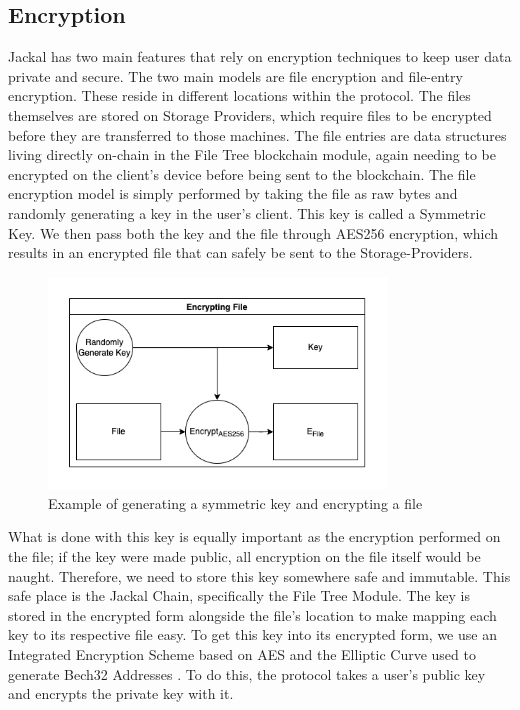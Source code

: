 \documentclass[a4paper]{article}
\begin{document}
\subsection{Encryption}
Jackal has two main features that rely on encryption techniques to keep user data private and secure. The two main models are file encryption and file-entry encryption. These reside in different locations within the protocol. The files themselves are stored on Storage Providers, which require files to be encrypted before they are transferred to those machines. The file entries are data structures living directly on-chain in the File Tree blockchain module, again needing to be encrypted on the client's device before being sent to the blockchain. The file encryption model is simply performed by taking the file as raw bytes and randomly generating a key in the user's client. This key is called a Symmetric Key. We then pass both the key and the file through AES256 encryption, which results in an encrypted file that can safely be sent to the Storage-Providers.
\begin{figure}[!htbp]
\centering
\includegraphics[width=0.8\textwidth]{assets/enc1.png}
\caption{Example of generating a symmetric key and encrypting a file}
\end{figure}

What is done with this key is equally important as the encryption performed on the file; if the key were made public, all encryption on the file itself would be naught. Therefore, we need to store this key somewhere safe and immutable. This safe place is the Jackal Chain, specifically the File Tree Module. The key is stored in the encrypted form alongside the file's location to make mapping each key to its respective file easy. To get this key into its encrypted form, we use an Integrated Encryption Scheme based on AES and the Elliptic Curve used to generate Bech32 Addresses \cite{bech32}. To do this, the protocol takes a user's public key and encrypts the private key with it.
\end{document}
